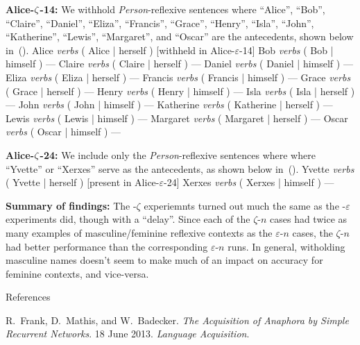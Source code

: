 \bigskip\noindent
{\bf Alice-$\boldmath \zeta$-14:} We withhold
{\em Person}-reflexive sentences where ``Alice'', ``Bob'', ``Claire'', ``Daniel'', ``Eliza'', ``Francis'', ``Grace'', ``Henry'', ``Isla'', ``John'', ``Katherine'', ``Lewis'', ``Margaret'', and ``Oscar'' are the antecedents, shown below in~(\nextx).
\pex
	\a Alice {\em verbs} ( Alice | herself ) \hfill [withheld in Alice-$\varepsilon$-14]
	\a Bob {\em verbs} ( Bob | himself ) \hfill ---
	\a Claire {\em verbs} ( Claire | herself ) \hfill ---
	\a Daniel {\em verbs} ( Daniel | himself ) \hfill ---
	\a Eliza {\em verbs} ( Eliza | herself ) \hfill ---
	\a Francis {\em verbs} ( Francis | himself ) \hfill ---
	\a Grace {\em verbs} ( Grace | herself ) \hfill ---
	\a Henry {\em verbs} ( Henry | himself ) \hfill ---
	\a Isla {\em verbs} ( Isla | herself ) \hfill ---
	\a John {\em verbs} ( John | himself ) \hfill ---
	\a Katherine {\em verbs} ( Katherine | herself ) \hfill ---
	\a Lewis {\em verbs} ( Lewis | himself ) \hfill ---
	\a Margaret {\em verbs} ( Margaret | herself ) \hfill ---
	\a Oscar {\em verbs} ( Oscar | himself ) \hfill ---
\xe

\bigskip\noindent
{\bf Alice-$\boldmath \zeta$-24:} We include only the
{\em Person}-reflexive sentences where where ``Yvette'' or ``Xerxes'' serve
as the antecedents, as shown below in~(\nextx).
\pex
	\a Yvette {\em verbs} ( Yvette | herself ) \hfill [present in Alice-$\varepsilon$-24]
	\a Xerxes {\em verbs} ( Xerxes | himself ) \hfill ---
\xe


{\bf Summary of findings:} The -$\zeta$ experiemnts turned out much the same
as the -$\varepsilon$ experiments did, though with a ``delay''. Since each of 
the $\zeta$-$n$ cases had twice as many examples of masculine/feminine 
reflexive contexts as the $\varepsilon$-$n$ cases, the $\zeta$-$n$ had better
performance than the corresponding $\varepsilon$-$n$ runs. In general, 
witholding masculine names doesn't seem to make much of an impact on accuracy
for feminine contexts, and vice-versa.


\sec References

\par\noindent
\bib [Frank2013] R.\ Frank, D.\ Mathis, and W.\ Badecker. {\em The Acquisition of Anaphora by Simple Recurrent Networks}. 18 June 2013. {\em Language Acquisition}.

\bye